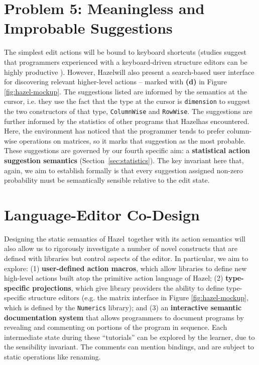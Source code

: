 \documentclass[letterpaper,USenglish]{lipics-v2016}
\let\li\lstinline
\newcommand{\Hazel}[0]{\textsf{Hazel}}
\newcommand{\HazelEnv}[0]{\Hazel}
\begin{document}
\section{Problem 5: Meaningless and Improbable Suggestions} 
The simplest 
edit actions will be bound to keyboard shortcuts (studies suggest that programmers experienced with a keyboard-driven structure editors can be highly productive \cite{DBLP:conf/vl/Asenov014}). However, \HazelEnv will also present a search-based user
interface for discovering relevant higher-level actions -- marked with \textbf{(d)} in Figure \ref{fig:hazel-mockup}. 
The suggestions 
listed are informed by the semantics at the cursor, i.e. they use the fact that
the type at the cursor is \li{dimension} to suggest the two constructors of that
type, \li{ColumnWise} and \li{RowWise}. The suggestions are further informed by
the statistics of other programs that \HazelEnv has encountered.  Here, the
environment has noticed that the programmer tends to prefer column-wise operations on 
matrices, so it marks that suggestion as the most probable. These suggestions are governed by
our fourth specific aim: a \textbf{statistical action suggestion semantics} (Section~\ref{sec:statistics}). The key invariant here that, again, we aim to establish 
formally is that every suggestion assigned non-zero probability must be semantically sensible 
relative to the edit state.%

\section{Language-Editor Co-Design}
Designing the static semantics of \HazelEnv~together with its action semantics 
will also allow us to rigorously investigate a number of novel constructs that 
are defined with libraries but control aspects of the editor. In particular, we aim to explore:
(1) \textbf{user-defined action macros}, which allow libraries to define new high-level
actions built atop the primitive action language of \HazelEnv; (2) \textbf{type-specific
projections}, which give library providers the ability to define type-specific structure editors (e.g. the matrix interface in Figure \ref{fig:hazel-mockup}, which is defined  
by the \li{Numerics} library); and (3) an \textbf{interactive semantic documentation system} that
allows programmers to document programs by revealing and commenting on portions of the 
program in sequence. Each intermediate state during these ``tutorials'' can be explored 
by the learner, due to the sensibility invariant. The comments can mention bindings, and are 
subject to static operations like renaming.
\end{document}
